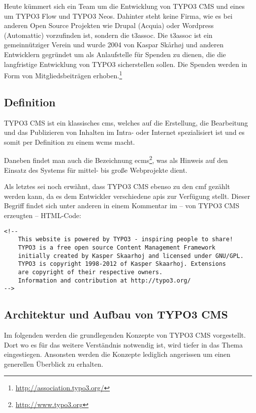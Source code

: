Heute kümmert sich ein Team um die Entwicklung von TYPO3 CMS und eines um TYPO3 Flow und TYPO3 Neos. Dahinter steht keine Firma, wie es bei anderen Open Source Projekten wie Drupal (Acquia) oder Wordpress (Automattic) vorzufinden ist, sondern die \gls{t3assoc}. Die \gls{t3assoc} ist ein gemeinnütziger Verein und wurde 2004 von Kaspar Skårhøj und anderen Entwicklern gegründet um als Anlaufstelle für Spenden zu dienen, die die langfristige Entwicklung von TYPO3 sicherstellen sollen. Die Spenden werden in Form von Mitgliedsbeiträgen erhoben.\footnote{\url{http://association.typo3.org/}}

\subsection{Definition}
TYPO3 CMS ist ein klassisches \gls{cms}, welches auf die Erstellung, die Bearbeitung und das Publizieren von Inhalten im Intra- oder Internet spezialisiert ist und es somit per Definition zu einem \gls{wcms} macht.

Daneben findet man auch die Bezeichnung \gls{ecms}\footnote{\url{http://www.typo3.org}}, was als Hinweis auf den Einsatz des Systems für mittel- bis große Webprojekte dient.

Als letztes sei noch erwähnt, dass TYPO3 CMS ebenso zu den \gls{cmf} gezählt werden kann, da es dem Entwickler verschiedene \gls{api}s zur Verfügung stellt. Dieser Begriff findet sich unter anderen in einem Kommentar im – von TYPO3 CMS erzeugten – HTML-Code:
\begin{verbatim}
<!--
    This website is powered by TYPO3 - inspiring people to share!
    TYPO3 is a free open source Content Management Framework
    initially created by Kasper Skaarhoj and licensed under GNU/GPL.
    TYPO3 is copyright 1998-2012 of Kasper Skaarhoj. Extensions
    are copyright of their respective owners.
    Information and contribution at http://typo3.org/
-->
\end{verbatim}

\subsection{Architektur und Aufbau von TYPO3 CMS}
\label{subsec:architectureTypo3}
Im folgenden werden die grundlegenden Konzepte von TYPO3 CMS vorgestellt. Dort wo es für das weitere Verständnis notwendig ist, wird tiefer in das Thema eingestiegen. Ansonsten werden die Konzepte lediglich angerissen um einen generellen Überblick zu erhalten.


